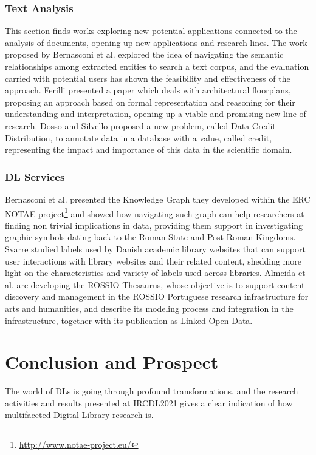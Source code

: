 \documentclass{sig-alternate-10pt}
\begin{document}
\subsubsection*{Text Analysis}
This section finds works exploring new potential applications connected to the analysis of documents, opening up new applications and research lines. 
The work proposed by Bernasconi et al. \cite{BernasconiCM21} explored the idea of navigating the semantic relationships among extracted entities to search a text corpus, and the evaluation carried with potential users has shown the feasibility and effectiveness of the approach.
Ferilli \cite{Ferilli21} presented a paper which deals with architectural floorplans, proposing an approach based on formal representation and reasoning for their understanding and interpretation, opening up a viable and promising new line of research.  
Dosso and Silvello \cite{DossoS21} proposed a new problem, called Data Credit Distribution, to annotate data in a database with a value, called credit, representing the impact and importance of this data in the scientific domain. 


\subsubsection*{DL Services}
Bernasconi et al. \cite{BernasconiBCCGL21} presented the Knowledge Graph they developed within the ERC NOTAE project\footnote{\url{http://www.notae-project.eu/}} and showed how navigating such graph can help researchers at finding non trivial implications in data, providing them support in investigating graphic symbols dating back to the Roman State and Post-Roman Kingdoms. 
Svarre \cite{Svarre21} studied labels used by Danish academic library websites that can support user interactions with library websites and their related content, shedding more light on the characteristics and variety of labels used across libraries. 
Almeida et al. \cite{AlmeidaFM21} are developing the ROSSIO Thesaurus, whose objective is to support content discovery and management in the ROSSIO Portuguese research infrastructure for arts and humanities, and describe its modeling process and integration in the infrastructure, together with its publication as Linked Open Data.


\section{Conclusion and Prospect}
The world of DLs is going through profound transformations,
and the research activities and results presented at
IRCDL2021 gives a clear indication of how multifaceted Digital Library research is.
\end{document}
